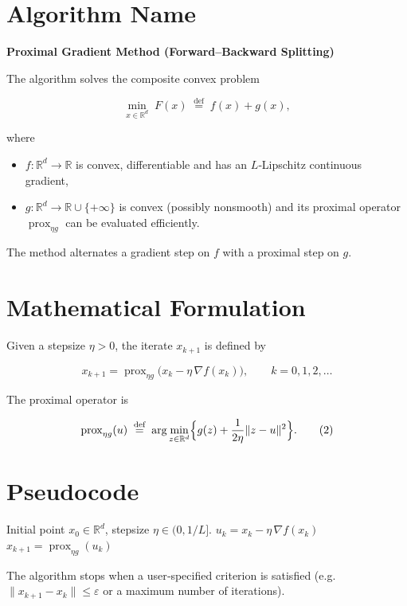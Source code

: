 \documentclass{article}
\newcommand{\prox}{\operatorname{prox}}
\newcommand{\grad}{\nabla}
\newcommand{\R}{\mathbb{R}}
\begin{document}
\section*{Algorithm Name}
\textbf{Proximal Gradient Method (Forward–Backward Splitting)}  

The algorithm solves the composite convex problem  

\[
\min_{x\in\R^{d}} \; F(x)\;\stackrel{\text{def}}{=}\; f(x)+g(x),
\]

where  

\begin{itemize}[nosep]
  \item $f:\R^{d}\to\R$ is convex, differentiable and has an $L$‑Lipschitz continuous gradient,
  \item $g:\R^{d}\to\R\cup\{+\infty\}$ is convex (possibly nonsmooth) and its proximal operator
        $\prox_{\eta g}$ can be evaluated efficiently.
\end{itemize}

The method alternates a gradient step on $f$ with a proximal step on $g$.

\section*{Mathematical Formulation}
Given a stepsize $\eta>0$, the iterate $x_{k+1}$ is defined by  

\[
\boxed{
x_{k+1}= \prox_{\eta g}\!\bigl(x_{k}-\eta\,\grad f(x_{k})\bigr)},
\qquad k=0,1,2,\dots
\tag{1}
\]

The proximal operator is  

\[
\prox_{\eta g}(u)\;\stackrel{\text{def}}{=}\;
\arg\min_{z\in\R^{d}}\Bigl\{ g(z)+\frac{1}{2\eta}\|z-u\|^{2}\Bigr\}.
\tag{2}
\]

\section*{Pseudocode}
\begin{algorithm}[H]
\caption{Proximal Gradient Method}
\begin{algorithmic}[1]
\Require Initial point $x_{0}\in\R^{d}$, stepsize $\eta\in(0,1/L]$.
    \State $u_{k}=x_{k}-\eta\,\grad f(x_{k})$ 
    \State $x_{k+1}= \prox_{\eta g}(u_{k})$ 
\EndFor
\end{algorithmic}
\end{algorithm}

The algorithm stops when a user‑specified criterion is satisfied (e.g. 
$\|x_{k+1}-x_{k}\|\leq\varepsilon$ or a maximum number of iterations).
\end{document}
